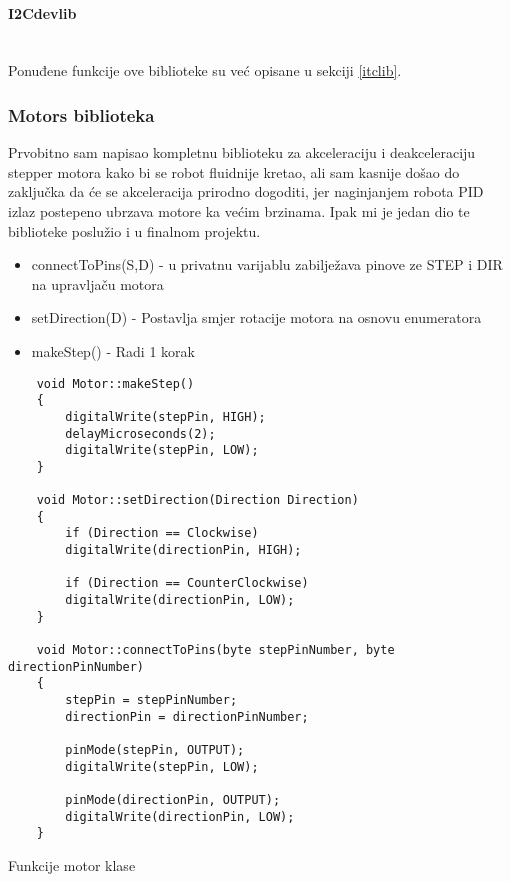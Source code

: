 \documentclass[../Document.tex]{subfiles}
\begin{document}
\paragraph{I2Cdevlib}\mbox{}\\
\noindent Ponuđene funkcije ove biblioteke su već opisane u sekciji \ref{itclib}.

\subsubsection{Motors biblioteka}
Prvobitno sam napisao kompletnu biblioteku za akceleraciju i deakceleraciju stepper motora kako bi se robot fluidnije kretao, ali sam kasnije došao do zaključka da će se akceleracija prirodno dogoditi, jer naginjanjem robota PID izlaz postepeno ubrzava motore ka većim brzinama. Ipak mi je jedan dio te biblioteke poslužio i u finalnom projektu.

\begin{itemize}
    \item connectToPins(S,D) - u privatnu varijablu zabilježava pinove ze STEP i DIR na upravljaču motora
    \item setDirection(D) - Postavlja smjer rotacije motora na osnovu enumeratora
    \item makeStep() - Radi 1 korak
\end{itemize}

\begin{code}
    \begin{verbatim}
    void Motor::makeStep()
    {
        digitalWrite(stepPin, HIGH);
        delayMicroseconds(2);
        digitalWrite(stepPin, LOW);
    }

    void Motor::setDirection(Direction Direction)
    {
        if (Direction == Clockwise)
        digitalWrite(directionPin, HIGH);

        if (Direction == CounterClockwise)
        digitalWrite(directionPin, LOW);
    }

    void Motor::connectToPins(byte stepPinNumber, byte directionPinNumber)
    {
        stepPin = stepPinNumber;
        directionPin = directionPinNumber;
        
        pinMode(stepPin, OUTPUT);
        digitalWrite(stepPin, LOW);

        pinMode(directionPin, OUTPUT);
        digitalWrite(directionPin, LOW);
    }
    \end{verbatim}
    \caption{Funkcije motor klase}
\end{code}
\end{document}
